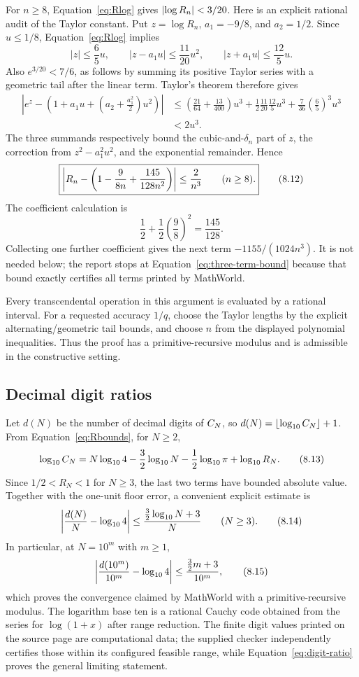 For $n\ge8$, Equation~\eqref{eq:Rlog} gives $\left|\log R_n\right|<3/20$.
Here is an explicit rational audit of the Taylor constant.  Put
$z=\log R_n$, $a_1=-9/8$, and $a_2=1/2$.  Since $u\le1/8$,
Equation~\eqref{eq:Rlog} implies
\[
 |z|\le\frac65u,\qquad
 |z-a_1u|\le\frac{11}{20}u^2,\qquad
 |z+a_1u|\le\frac{12}{5}u.
\]
Also $e^{3/20}<7/6$, as follows by summing its positive Taylor series with a
geometric tail after the linear term.  Taylor's theorem therefore gives
\begin{align*}
 \left|e^z-\left(1+a_1u+
          \left(a_2+\frac{a_1^2}{2}\right)u^2\right)\right|
 &\le \left(\frac{21}{64}+\frac{13}{400}\right)u^3
   +\frac12\frac{11}{20}\frac{12}{5}u^3
   +\frac{7}{36}\left(\frac65\right)^3u^3\\
 &<2u^3.
\end{align*}
The three summands respectively bound the cubic-and-$\delta_n$ part of $z$,
the correction from $z^2-a_1^2u^2$, and the exponential remainder.  Hence
\[
 \boxed{\displaystyle
 \left|R_n-
  \left(1-\frac9{8n}+\frac{145}{128n^2}\right)\right|
 \le\frac2{n^3}\qquad(n\ge8).}                                 \tag{8.12}\label{eq:three-term-bound}
\]
The coefficient calculation is
\[
 \frac12+\frac12\left(\frac98\right)^2=\frac{145}{128}.
\]
Collecting one further coefficient gives the next term
$-1155/(1024n^3)$.  It is not needed below; the report stops at
Equation~\eqref{eq:three-term-bound} because that bound exactly certifies all
terms printed by MathWorld.

Every transcendental operation in this argument is evaluated by a rational
interval.  For a requested accuracy $1/q$, choose the Taylor lengths by the
explicit alternating/geometric tail bounds, and choose $n$ from the displayed
polynomial inequalities.  Thus the proof has a primitive-recursive modulus
and is admissible in the constructive setting.

\subsection{Decimal digit ratios}

Let $d(N)$ be the number of decimal digits of $C_N$, so
$d(N)=\left\lfloor \log_{10}C_N\right\rfloor+1$.  From Equation~\eqref{eq:Rbounds}, for
$N\ge2$,
\[
 \log_{10}C_N
 =N\log_{10}4-\frac32\log_{10}N-\frac12\log_{10}\pi
  +\log_{10}R_N.                                                 \tag{8.13}
\]
Since $1/2<R_N<1$ for $N\ge3$, the last two terms have bounded absolute value.
Together with the one-unit floor error, a convenient explicit estimate is
\[
 \left|\frac{d(N)}N-\log_{10}4\right|
 \le\frac{\tfrac32\log_{10}N+3}{N}\qquad(N\ge3).                \tag{8.14}\label{eq:digit-bound}
\]
In particular, at $N=10^m$ with $m\ge1$,
\[
 \left|\frac{d(10^m)}{10^m}-\log_{10}4\right|
 \le\frac{\tfrac32m+3}{10^m},                                  \tag{8.15}\label{eq:digit-ratio}
\]
which proves the convergence claimed by MathWorld with a primitive-recursive
modulus.  The logarithm base ten is a rational Cauchy code obtained from the
series for $\log(1+x)$ after range reduction.  The finite digit values printed
on the source page are computational data; the supplied checker independently
certifies those within its configured feasible range, while
Equation~\eqref{eq:digit-ratio} proves the general limiting statement.
